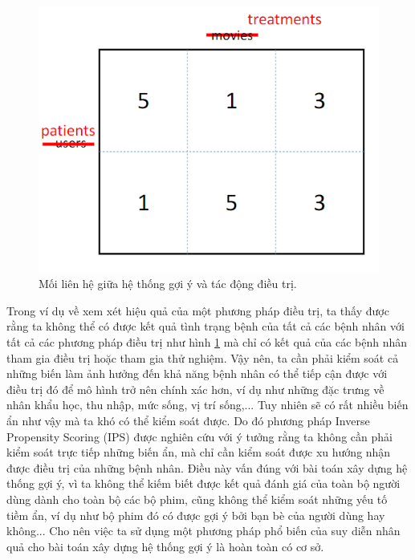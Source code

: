 \begin{figure}[h]
    \centering
    \includegraphics[width=\textwidth]{images/Chapter3/treatment.png}
    \caption{Mối liên hệ giữa hệ thống gợi ý và tác động điều trị.}
    \label{fig:3.0_treatment}
\end{figure}

Trong ví dụ về xem xét hiệu quả của một phương pháp điều trị, ta thấy được rằng ta không thể có được kết quả tình trạng bệnh của tất cả các bệnh nhân với tất cả các phương pháp điều trị như hình \ref{fig:3.0_treatment} mà chỉ có kết quả của các bệnh nhân tham gia điều trị hoặc tham gia thử nghiệm. Vậy nên, ta cần phải kiểm soát cả những biến làm ảnh hưởng đến khả năng bệnh nhân có thể tiếp cận được với điều trị đó để mô hình trở nên chính xác hơn, ví dụ như những đặc trưng về nhân khẩu học, thu nhập, mức sống, vị trí sống,... Tuy nhiên sẽ có rất nhiều biến ẩn như vậy mà ta khó có thể kiểm soát được. Do đó phương pháp Inverse Propensity Scoring (IPS) được nghiên cứu với ý tưởng rằng ta không cần phải kiểm soát trực tiếp những biến ẩn, mà chỉ cần kiểm soát được xu hướng nhận được điều trị của những bệnh nhân. Điều này vấn đúng với bài toán xây dựng hệ thống gợi ý, vì ta không thể kiếm biết được kết quả đánh giá của toàn bộ người dùng dành cho toàn bộ các bộ phim, cũng không thể kiểm soát những yếu tố tiềm ẩn, ví dụ như bộ phim đó có được gợi ý bởi bạn bè của người dùng hay không... Cho nên việc ta sử dụng một phương pháp phổ biến của suy diễn nhân quả cho bài toán xây dựng hệ thống gợi ý là hoàn toàn có cơ sở.

